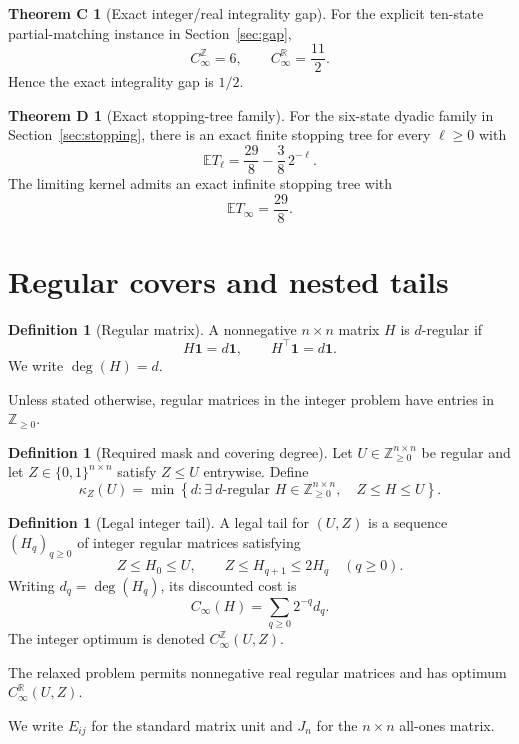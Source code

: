 \documentclass[11pt]{article}
\theoremstyle{definition}
\newtheorem{definition}[theorem]{Definition}
\newtheorem*{theoremC}{Theorem C}
\newtheorem*{theoremD}{Theorem D}
\newcommand{\one}{\mathbf 1}
\newcommand{\degm}{\operatorname{deg}}
\newcommand{\R}{\mathbb R}
\newcommand{\Z}{\mathbb Z}
\begin{document}
\begin{theoremC}[Exact integer/real integrality gap]
For the explicit ten-state partial-matching instance in Section~\ref{sec:gap},
\[
C_\infty^{\Z}=6,
\qquad
C_\infty^{\R}=\frac{11}{2}.
\]
Hence the exact integrality gap is $1/2$.
\end{theoremC}

\begin{theoremD}[Exact stopping-tree family]
For the six-state dyadic family in Section~\ref{sec:stopping},
there is an exact finite stopping tree for every $\ell\ge0$ with
\[
\mathbb E T_\ell
=
\frac{29}{8}-\frac38\,2^{-\ell}.
\]
The limiting kernel admits an exact infinite stopping tree with
\[
\mathbb E T_\infty=\frac{29}{8}.
\]
\end{theoremD}

\section{Regular covers and nested tails}
\label{sec:model}

\begin{definition}[Regular matrix]
A nonnegative $n\times n$ matrix $H$ is $d$-regular if
\[
H\one=d\one,
\qquad
H^\top\one=d\one.
\]
We write $\degm(H)=d$.
\end{definition}

Unless stated otherwise, regular matrices in the integer problem have entries in $\Z_{\ge0}$.

\begin{definition}[Required mask and covering degree]
Let $U\in\Z_{\ge0}^{n\times n}$ be regular and let
$Z\in\{0,1\}^{n\times n}$ satisfy $Z\le U$ entrywise.  Define
\[
\kappa_Z(U)
=
\min\left\{
d:
\exists\ d\text{-regular }H\in\Z_{\ge0}^{n\times n},
\quad
Z\le H\le U
\right\}.
\]
\end{definition}

\begin{definition}[Legal integer tail]
A legal tail for $(U,Z)$ is a sequence
$(H_q)_{q\ge0}$ of integer regular matrices satisfying
\[
Z\le H_0\le U,
\qquad
Z\le H_{q+1}\le2H_q
\quad(q\ge0).
\]
Writing $d_q=\degm(H_q)$, its discounted cost is
\[
C_\infty(H)
=
\sum_{q\ge0}2^{-q}d_q.
\]
The integer optimum is denoted $C_\infty^\Z(U,Z)$.
\end{definition}

The relaxed problem permits nonnegative real regular matrices and has optimum
$C_\infty^\R(U,Z)$.

We write $E_{ij}$ for the standard matrix unit and $J_n$ for the $n\times n$ all-ones matrix.
\end{document}
